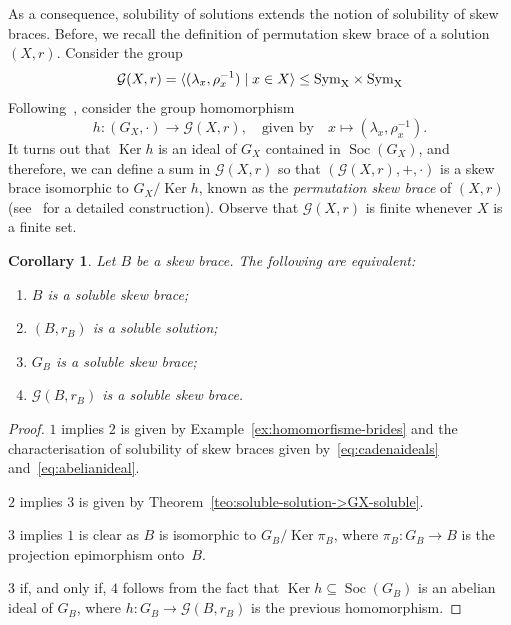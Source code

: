 \documentclass[12pt, a4paper, english]{article}
\newtheorem{corolari}[teorema]{Corollary}
\theoremstyle{definition}
\theoremstyle{remark}
\DeclareMathOperator{\Ker}{Ker}
\DeclareMathOperator{\Soc}{Soc}
\begin{document}
As a consequence, solubility of solutions extends the notion of solubility of skew braces. Before, we recall the definition of permutation skew brace of a solution $(X,r)$. Consider the group 
\[ \mathcal{G}(X,r) = \langle (\lambda_x, \rho_x^{-1}) \mid x \in X \rangle \leq \rm{Sym}_{X}\times \rm{Sym}_X\]
Following~\cite[Definition 1.5]{CedoJespersKubatVanAntwerpenVerwimp23}, consider the group homomorphism 
\[ h\colon (G_X,\cdot) \rightarrow \mathcal{G}(X,r), \quad \text{given by} \quad x \mapsto (\lambda_x, \rho_x^{-1}).\]
It turns out that $\Ker h$ is an ideal of $G_X$ contained in $\Soc(G_X)$, and therefore, we can define a sum in $\mathcal{G}(X,r)$ so that $(\mathcal{G}(X,r),+,\cdot)$ is a skew brace isomorphic to $G_X/\Ker h$, known as the \emph{permutation skew brace} of $(X,r)$ (see~\cite{CedoJespersKubatVanAntwerpenVerwimp23} for a detailed construction). Observe that $\mathcal{G}(X,r)$ is finite whenever $X$ is a finite set.
\begin{corolari}
\label{cor:soluble-brace-solution}
Let $B$ be a skew brace. The following are equivalent:
\begin{enumerate}
\item $B$ is a soluble skew brace;
\item $(B, r_B)$ is a soluble solution;
\item $G_B$ is a soluble skew brace;
\item $\mathcal{G}(B,r_B)$ is a soluble skew brace.
\end{enumerate}
\end{corolari}


\begin{proof} 
$1$ implies $2$ is given by Example~\ref{ex:homomorfisme-brides} and the characterisation of solubility of skew braces given by~\eqref{eq:cadenaideals} and~\eqref{eq:abelianideal}. 

$2$ implies $3$ is given by Theorem~\ref{teo:soluble-solution->GX-soluble}.

$3$ implies $1$ is clear as $B$ is isomorphic to $G_B/\Ker \pi_B$, where $\pi_B\colon G_B \rightarrow B$ is the projection epimorphism onto~$B$.

$3$ if, and only if, $4$ follows from the fact that $\Ker h \subseteq \Soc(G_B)$ is an abelian ideal of $G_B$, where $h\colon G_B \rightarrow \mathcal{G}(B,r_B)$ is the previous homomorphism.
\end{proof}
\end{document}
